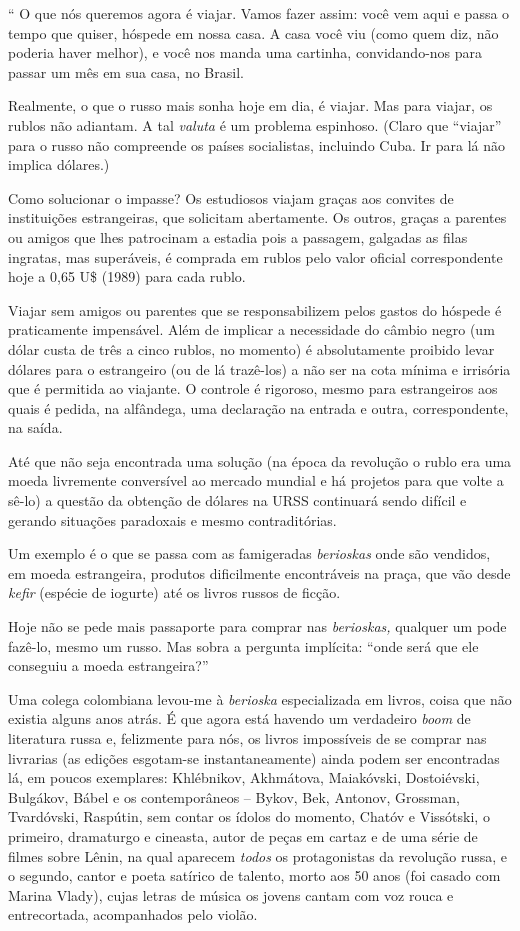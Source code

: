 `` O que nós queremos agora é viajar. Vamos fazer assim: você vem aqui e
passa o tempo que quiser, hóspede em nossa casa. A casa você viu (como
quem diz, não poderia haver melhor), e você nos manda uma cartinha,
convidando-nos para passar um mês em sua casa, no Brasil.

Realmente, o que o russo mais sonha hoje em dia, é viajar. Mas para
viajar, os rublos não adiantam. A tal \emph{valuta} é um problema
espinhoso. (Claro que ``viajar'' para o russo não compreende os países
socialistas, incluindo Cuba. Ir para lá não implica dólares.)

Como solucionar o impasse? Os estudiosos viajam graças aos convites de
instituições estrangeiras, que solicitam abertamente. Os outros, graças
a parentes ou amigos que lhes patrocinam a estadia pois a passagem,
galgadas as filas ingratas, mas superáveis, é comprada em rublos pelo
valor oficial correspondente hoje a 0,65 U\$ (1989) para cada rublo.

Viajar sem amigos ou parentes que se responsabilizem pelos gastos do
hóspede é praticamente impensável. Além de implicar a necessidade do
câmbio negro (um dólar custa de três a cinco rublos, no momento) é
absolutamente proibido levar dólares para o estrangeiro (ou de lá
trazê-los) a não ser na cota mínima e irrisória que é permitida ao
viajante. O controle é rigoroso, mesmo para estrangeiros aos quais é
pedida, na alfândega, uma declaração na entrada e outra, correspondente,
na saída.

Até que não seja encontrada uma solução (na época da revolução o rublo
era uma moeda livremente conversível ao mercado mundial e há projetos
para que volte a sê-lo) a questão da obtenção de dólares na URSS
continuará sendo difícil e gerando situações paradoxais e mesmo
contraditórias.

Um exemplo é o que se passa com as famigeradas \emph{berioskas} onde são
vendidos, em moeda estrangeira, produtos dificilmente encontráveis na
praça, que vão desde \emph{kefir} (espécie de iogurte) até os livros
russos de ficção.

Hoje não se pede mais passaporte para comprar nas \emph{berioskas,}
qualquer um pode fazê-lo, mesmo um russo. Mas sobra a pergunta
implícita: ``onde será que ele conseguiu a moeda estrangeira?''

Uma colega colombiana levou-me à \emph{berioska} especializada em
livros, coisa que não existia alguns anos atrás. É que agora está
havendo um verdadeiro \emph{boom} de literatura russa e, felizmente para
nós, os livros impossíveis de se comprar nas livrarias (as edições
esgotam-se instantaneamente) ainda podem ser encontradas lá, em poucos
exemplares: Khlébnikov, Akhmátova, Maiakóvski, Dostoiévski, Bulgákov,
Bábel e os contemporâneos -- Bykov, Bek, Antonov, Grossman, Tvardóvski,
Raspútin, sem contar os ídolos do momento, Chatóv e Vissótski, o
primeiro, dramaturgo e cineasta, autor de peças em cartaz e de uma série
de filmes sobre Lênin, na qual aparecem \emph{todos} os protagonistas da
revolução russa, e o segundo, cantor e poeta satírico de talento, morto
aos 50 anos (foi casado com Marina Vlady), cujas letras de música os
jovens cantam com voz rouca e entrecortada, acompanhados pelo violão.

